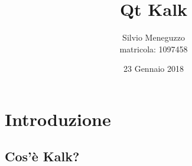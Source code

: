 \documentclass[10pt]{beamer}
\title[Space Kalk]{Qt Kalk} %
\author{Silvio Meneguzzo \\ matricola: 1097458 } %
\institute[Unipd] %
{
Università di Padova - Dipartimento di Matematica \\ %
\medskip
\textit{meneguzzosilvio@gmail.com} %
}
\date{23 Gennaio 2018} %
\begin{document}
\begin{frame}
\titlepage %
\end{frame}



\section{Introduzione} %

\subsection{Cos'è Kalk?} %
\end{document}
